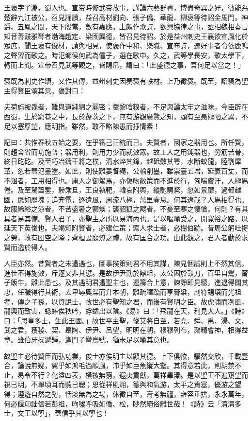 \begin{pinyinscope}
王褒字子淵，蜀人也。宣帝時修武帝故事，講論六藝群書，博盡奇異之好，徵能為楚辭九江被公，召見誦讀，益召高材劉向、張子僑、華龍、柳褒等待詔金馬門。神爵、五鳳之間，天下殷當，數有嘉應。上頗作歌詩，欲興協律之事，丞相魏相奏言知音善鼓雅琴者渤海趙定、梁國龔德，皆召見待詔。於是益州刺史王襄欲宣風化於眾庶，聞王褒有俊材，請與相見，使褒作中和、樂職、宣布詩，選好事者令依鹿鳴之聲習而歌之。時氾鄉侯何武為僮子，選在歌中。久之，武等學長安，歌太學下，轉而上聞。宣帝召見武等觀之，皆賜帛，謂曰：「此盛德之事，吾何足以當之！」

褒既為刺史作頌，又作其傳，益州刺史因奏褒有軼材。上乃徵褒。既至，詔褎為聖主得賢臣頌其意。褒對曰：

夫荷旃被毳者，難與道純綿之麗密；羹黎唅糗者，不足與論太牢之滋味。今臣辟在西蜀，生於窮巷之中，長於蓬茨之下，無有游觀廣覽之知，顧有至愚極陋之累，不足以塞厚望，應明指。雖然，敢不略陳愚而抒情素！

記曰：共惟春秋五始之要，在乎審己正統而已。夫賢者，國家之器用也。所任賢，則趨舍省而功施普；器用利，則用力少而就效眾。故工人之用鈍器也，勞筋苦骨，終日矻矻。及至巧冶鑄干將之樸，清水焠其鋒，越砥斂其咢，水斷蛟龍，陸剸犀革，忽若彗氾畫塗。如此，則使離婁督繩，公輸削墨，雖崇臺五增，延袤百丈，而不溷者，工用相得也。庸人之御駑馬，亦傷吻敝策而不進於行，匈喘膚汗，人極馬倦。及至駕齧錾，驂乘旦，王良執靶，韓哀附輿，縱馳騁騖，忽如景靡，過都越國，蹶如歷塊；追奔電，逐遺風，周流八極，萬里壹息。何其遼哉？人馬相得也。故服絺綌之涼者，不苦盛暑之鬱燠；襲貂狐之飕者，不憂至寒之悽愴。何則？有其具者易其備。賢人君子，亦聖主之所以易海內也。是以嘔喻受之，開寬裕之路，以延天下英俊也。夫竭知附賢者，必建仁策；索人求士者，必樹伯跡。昔周公躬吐捉之勞，故有圉空之隆；齊桓設庭燎之禮，故有匡合之功。由此觀之，君人者勤於求賢而逸於得人。

人臣亦然。昔賢者之未遭遇也，圖事揆策則君不用其謀，陳見悃誠則上不然其信，進仕不得施效，斥逐又非其愆。是故伊尹勤於鼎俎，太公困於鼓刀，百里自鬻，甯子飯牛，離此患也。及其遇明君遭聖主也，運籌合上意，諫諍即見聽，進退得關其忠，任職得行其術，去卑辱奧渫而升本朝，離疏釋蹻而享膏粱，剖符錫壤而光祖考，傳之子孫，以資說士。故世必有聖知之君，而後有賢明之臣。故虎嘯而冽風，龍興而致雲，蟋蟀俟秋吟，蜉蝤出以陰。《易》曰：「飛龍在天，利見大人。」《詩》曰：「思皇多士，生此王國。」故世平主聖，俊艾將自至，若堯、舜、禹、湯、文、武之君，獲稷、契、皋陶、伊尹、呂望，明明在朝，穆穆列布，聚精會神，相得益章。雖伯牙操遞鍾，逢門子彎烏號，猶未足以喻其意也。

故聖主必待賢臣而弘功業，俊士亦俟明主以顯其德。上下俱欲，驩然交欣，千載壹合，論說無疑，翼乎如鴻毛過順風，沛乎如巨魚縱大壑。其得意若此，則胡禁不止，曷令不行？化溢四表，橫被無窮，遐夷貢獻，萬祥畢溱。是以聖王不遍窺望而視已明，不單頃耳而聽已聰；恩從祥風翱，德與和氣游，太平之責塞，優游之望得；遵遊自然之勢，恬淡無為之場，休徵自至，壽考無疆，雍容垂拱，永永萬年，何必偃卬詘信若彭祖，呴噓呼吸如僑、松，眇然絕俗離世哉！《詩》云「濟濟多士，文王以寧」，蓋信乎其以寧也！


\end{pinyinscope}
